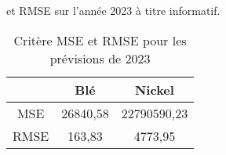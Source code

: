 et RMSE sur l'année 2023 à titre informatif.
\begin{table}[H]
    \centering
    \caption{Critère MSE et RMSE pour les prévisions de 2023}
    \sffamily
    \begin{tabular}{ccc}
    \toprule
    & Blé &	Nickel \\
    \midrule
    MSE	    &   26840,58    &	22790590,23 \\
    RMSE    &	163,83      &	4773,95 \\
    \bottomrule
    \end{tabular}
\end{table}


